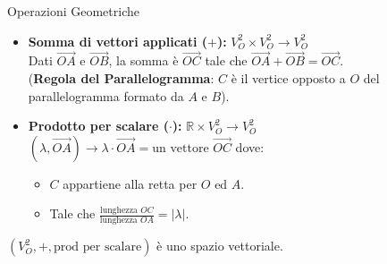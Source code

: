 \begin{proposition}{Operazioni Geometriche}{}
\begin{itemize}
    \item \textbf{Somma di vettori applicati ($+$):} $V_O^2 \times V_O^2 \to V_O^2$ \\
    Dati $\overrightarrow{OA}$ e $\overrightarrow{OB}$, la somma è $\overrightarrow{OC}$ tale che $\overrightarrow{OA} + \overrightarrow{OB} = \overrightarrow{OC}$.\\
    (\textbf{Regola del Parallelogramma}: $C$ è il vertice opposto a $O$ del parallelogramma formato da $A$ e $B$).

    \item \textbf{Prodotto per scalare ($\cdot$):} $\mathbb{R} \times V_O^2 \to V_O^2$ \\
    $(\lambda, \overrightarrow{OA}) \to \lambda \cdot \overrightarrow{OA} = \text{un vettore } \overrightarrow{OC}$ dove:
    \begin{itemize}
        \item $C$ appartiene alla retta per $O$ ed $A$.
        \item Tale che $\frac{\text{lunghezza } OC}{\text{lunghezza } OA} = |\lambda|$.
    \end{itemize}
\end{itemize}
\end{proposition}

\begin{tcolorbox}[colback=white, colframe=cherryRed, title=Affermazione (AFF)]
$(V_O^2, +, \text{prod per scalare})$ è uno spazio vettoriale.
\end{tcolorbox}

\restoregeometry

